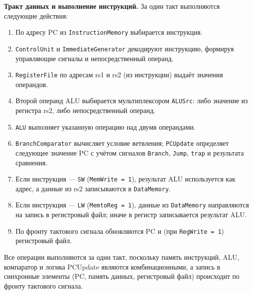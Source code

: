 \textbf{Тракт данных и выполнение инструкций.} За один такт выполняются следующие действия:
\begin{enumerate}
  \item По адресу PC из \texttt{InstructionMemory} выбирается инструкция.
  \item \texttt{ControlUnit} и \texttt{ImmediateGenerator} декодируют инструкцию, формируя управляющие сигналы и непосредственный операнд.
  \item \texttt{RegisterFile} по адресам rs1 и rs2 (из инструкции) выдаёт значения операндов.
  \item Второй операнд ALU выбирается мультиплексором \texttt{ALUSrc}: либо значение из регистра rs2, либо непосредственный операнд.
  \item \texttt{ALU} выполняет указанную операцию над двумя операндами.
  \item \texttt{BranchComparator} вычисляет условие ветвления; \texttt{PCUpdate} определяет следующее значение PC с учётом сигналов \texttt{Branch}, \texttt{Jump}, \texttt{trap} и результата сравнения.
  \item Если инструкция — \texttt{SW} (\texttt{MemWrite = 1}), результат ALU используется как адрес, а данные из rs2 записываются в \texttt{DataMemory}.
  \item Если инструкция — \texttt{LW} (\texttt{MemtoReg = 1}), данные из \texttt{DataMemory} направляются на запись в регистровый файл; иначе в регистр записывается результат ALU.
  \item По фронту тактового сигнала обновляются PC и (при \texttt{RegWrite = 1}) регистровый файл.
\end{enumerate}
Все операции выполняются за один такт, поскольку память инструкций, ALU, компаратор и логика PCUpdate являются комбинационными, а запись в синхронные элементы (PC, память данных, регистровый файл) происходит по фронту тактового сигнала.

